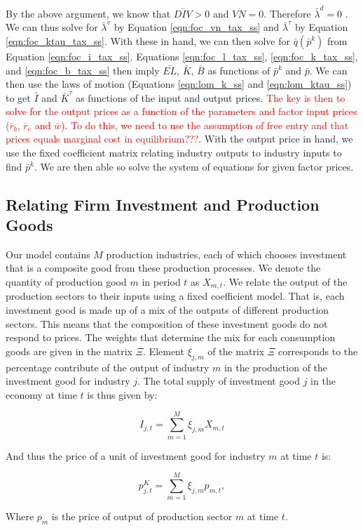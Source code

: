 By the above argument, we know that $\overline{DIV}>0$ and $\overline{VN}=0$.  Therefore $\bar{\lambda}^{d}=0$ .  We can thus solve for $\bar{\lambda}^{v}$ by Equation \ref{eqn:foc_vn_tax_ss} and $\bar{\lambda}^{\tau}$ by Equation \ref{eqn:foc_ktau_tax_ss}.  With these in hand, we can then solve for $\bar{q}(\bar{p}^{k})$ from Equation \ref{eqn:foc_i_tax_ss}.  Equations \ref{eqn:foc_l_tax_ss}, \ref{eqn:foc_k_tax_ss}, and \ref{eqn:foc_b_tax_ss} then imply $\bar{EL}$, $\bar{K}$, $\bar{B}$ as functions of $\bar{p}^{k}$ and $\bar{p}$.    We can then use the laws of motion (Equations \ref{eqn:lom_k_ss} and \ref{eqn:lom_ktau_ss}) to get $\bar{I}$ and $\bar{K}^{\tau}$ as functions of the input and output prices.  \textcolor{red}{The key is then to solve for the output prices as a function of the parameters and factor input prices ($\bar{r}_{b}$, $\bar{r}_{e}$ and $\bar{w}$).  To do this, we need to use the assumption of free entry and that prices equals marginal cost in equilibrium???}.  With the output price in hand, we use the fixed coefficient matrix relating industry outputs to industry inputs to find $\bar{p}^{k}$.  We are then able so solve the system of equations for given factor prices.  








    \subsection{Relating Firm Investment and Production Goods}\label{sec:prod_invest_map}
    
    Our model contains $M$ production industries, each of which chooses investment that is a composite good from these production processes.  We denote the quantity of production good $m$ in period $t$ as $X_{m,t}$.  We relate the output of the production sectors to their inputs using a fixed coefficient model. That is, each investment good is made up of a mix of the outputs of different production sectors.  This means that the composition of these investment goods do not respond to prices.  The weights that determine the mix for each consumption goods are given in the matrix $\Xi$.  Element $\xi_{j,m}$ of the matrix $\Xi$ corresponds to the percentage contribute of the output of industry $m$ in the production of the investment good for industry $j$.  The total supply of investment good $j$ in the economy at time $t$ is thus given by: 
    
             \begin{equation} \label{eqn:mix_cons}
             I_{j,t} = \sum_{m=1}^{M}\xi_{j,m}X_{m,t} 
    	\end{equation}
	
	And thus the price of a unit of investment good for industry $m$ at time $t$ is:
	
             \begin{equation} \label{eqn:mix_cons_price}
             p^{K}_{j,t} = \sum_{m=1}^{M}\xi_{j,m}p_{m,t}, 
    	\end{equation}
    
    Where $p_{m}$ is the price of output of production sector $m$ at time $t$.



